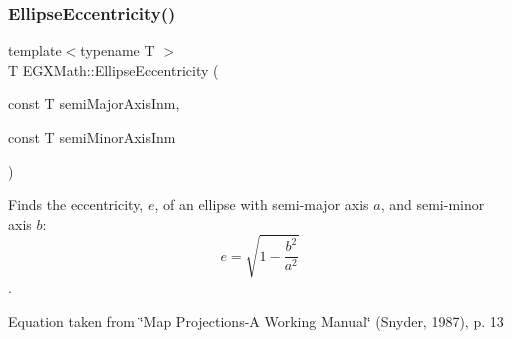 \mbox{\label{group___e_g_x_math-_geometry-2_d-_ellipse-_eccentricity_ga4e01cf027d303bb4ecb75606e5240d6c}} 
\subsubsection{\texorpdfstring{Ellipse\+Eccentricity()}{EllipseEccentricity()}\hspace{0.1cm}{\footnotesize\ttfamily [2/2]}}
{\footnotesize\ttfamily template$<$typename T $>$ \\
T E\+G\+X\+Math\+::\+Ellipse\+Eccentricity (\begin{DoxyParamCaption}\item[{const T}]{semi\+Major\+Axis\+Inm,  }\item[{const T}]{semi\+Minor\+Axis\+Inm }\end{DoxyParamCaption})}



Finds the eccentricity, $e$, of an ellipse with semi-\/major axis $a$, and semi-\/minor axis $b$\+: \[ e = \sqrt{1-\frac{b^2}{a^2}}\]. 

Equation taken from \char`\"{}\+Map Projections-\/\+A Working Manual\char`\"{} (Snyder, 1987), p. 13

